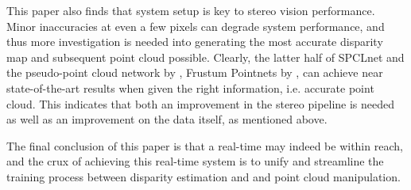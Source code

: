 This paper also finds that system setup is key to stereo vision performance. Minor inaccuracies at even a few pixels can degrade system performance, and thus more investigation is needed into generating the most accurate disparity map and subsequent point cloud possible. Clearly, the latter half of SPCLnet and the pseudo-point cloud network by \cite{wang_pseudo-lidar_2019}, Frustum Pointnets by \cite{qi_frustum_2017}, can achieve near state-of-the-art results when given the right information, i.e. accurate point cloud. This indicates that both an improvement in the stereo pipeline is needed as well as an improvement on the data itself, as mentioned above.

The final conclusion of this paper is that a real-time may indeed be within reach, and the crux of achieving this real-time system is to unify and streamline the training process between disparity estimation and and point cloud manipulation. 







